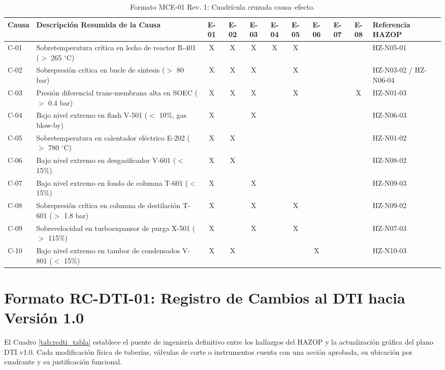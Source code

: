 \documentclass[10pt,letterpaper]{article}
\begin{document}
\begin{table}[H]
\centering\footnotesize
\caption{Formato MCE-01 Rev. 1: Cuadrícula cruzada causa--efecto.} \label{tab:mcer1_tabla}
\begin{tabularx}{\textwidth}{|l|X|c|c|c|c|c|c|c|c|p{2.6cm}|}
\hline
\rowcolor{tableheader}\color{white}\textbf{Causa} & \color{white}\textbf{Descripción Resumida de la Causa} & \color{white}\textbf{E-01} & \color{white}\textbf{E-02} & \color{white}\textbf{E-03} & \color{white}\textbf{E-04} & \color{white}\textbf{E-05} & \color{white}\textbf{E-06} & \color{white}\textbf{E-07} & \color{white}\textbf{E-08} & \color{white}\textbf{Referencia HAZOP} \\ \hline
C-01 & Sobretemperatura crítica en lecho de reactor R-401 ($>$ 265 $^\circ$C) & X & X & X & X & X &  &  &  & HZ-N05-01 \\ \hline
C-02 & Sobrepresión crítica en bucle de síntesis ($>$ 80 bar) & X & X & X &  & X &  &  &  & HZ-N03-02 / HZ-N06-04 \\ \hline
C-03 & Presión diferencial trans-membrana alta en SOEC ($>$ 0.4 bar) & X & X & X &  & X &  &  & X & HZ-N01-03 \\ \hline
C-04 & Bajo nivel extremo en flash V-501 ($<$ 10\%, gas blow-by) & X &  & X &  &  &  &  &  & HZ-N06-03 \\ \hline
C-05 & Sobretemperatura en calentador eléctrico E-202 ($>$ 780 $^\circ$C) & X & X &  &  &  &  &  &  & HZ-N01-02 \\ \hline
C-06 & Bajo nivel extremo en desgasificador V-601 ($<$ 15\%) & X & X &  &  &  &  &  &  & HZ-N08-02 \\ \hline
C-07 & Bajo nivel extremo en fondo de columna T-601 ($<$ 15\%) & X &  & X &  &  &  &  &  & HZ-N09-03 \\ \hline
C-08 & Sobrepresión crítica en columna de destilación T-601 ($>$ 1.8 bar) & X &  & X &  & X &  &  &  & HZ-N09-02 \\ \hline
C-09 & Sobrevelocidad en turboexpansor de purga X-501 ($>$ 115\%) & X &  & X &  & X &  &  &  & HZ-N07-03 \\ \hline
C-10 & Bajo nivel extremo en tambor de condensados V-801 ($<$ 15\%) & X & X &  &  &  & X &  &  & HZ-N10-03 \\ \hline
\end{tabularx}
\end{table}
\newpage

\section{Formato RC-DTI-01: Registro de Cambios al DTI hacia Versión 1.0}
El Cuadro \ref{tab:rcdti_tabla} establece el puente de ingeniería definitivo entre los hallazgos del HAZOP y la actualización gráfica del plano DTI v1.0. Cada modificación física de tuberías, válvulas de corte o instrumentos cuenta con una acción aprobada, su ubicación por cuadrante y su justificación funcional.
\end{document}
